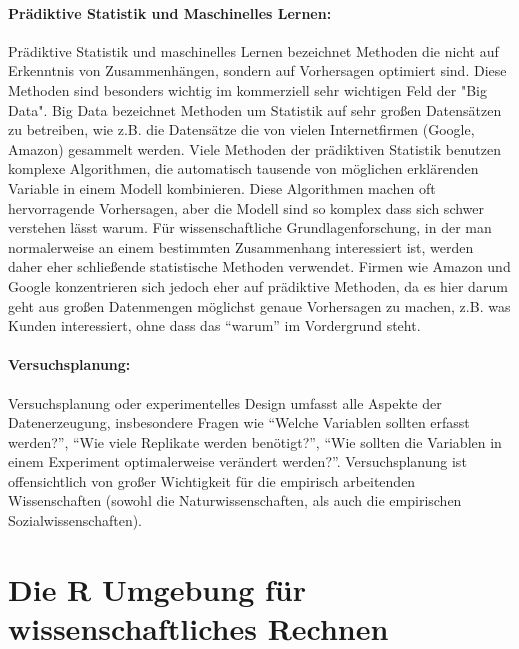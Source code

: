 \documentclass[a4paper,twoside]{tufte-book}\usepackage[]{graphicx}\usepackage[]{color}
\begin{document}
	\paragraph{Prädiktive Statistik und Maschinelles Lernen:} Prädiktive Statistik und maschinelles Lernen bezeichnet Methoden die nicht auf Erkenntnis von Zusammenhängen, sondern auf Vorhersagen optimiert sind. Diese Methoden sind besonders wichtig im kommerziell sehr wichtigen Feld der "Big Data". Big Data bezeichnet Methoden um Statistik auf sehr großen Datensätzen zu betreiben, wie  z.B. die Datensätze die von vielen Internetfirmen (Google, Amazon) gesammelt werden. Viele Methoden der prädiktiven Statistik benutzen komplexe Algorithmen, die automatisch tausende von möglichen erklärenden Variable in einem Modell kombinieren. Diese Algorithmen machen oft hervorragende Vorhersagen, aber die Modell sind so komplex dass sich schwer verstehen lässt warum. Für wissenschaftliche Grundlagenforschung, in der man normalerweise an einem bestimmten Zusammenhang interessiert ist, werden daher eher schließende statistische Methoden verwendet. Firmen wie Amazon und Google konzentrieren sich jedoch eher auf prädiktive Methoden, da es hier darum geht aus großen Datenmengen möglichst genaue Vorhersagen zu machen, z.B. was Kunden interessiert, ohne dass das "`warum"' im Vordergrund steht. 
	
	\paragraph{Versuchsplanung:} Versuchsplanung oder experimentelles Design umfasst alle Aspekte der Datenerzeugung, insbesondere Fragen wie "`Welche Variablen sollten erfasst werden?"', "`Wie viele Replikate werden benötigt?"', "`Wie sollten die Variablen in einem Experiment optimalerweise verändert werden?"'. Versuchsplanung ist offensichtlich von großer Wichtigkeit für die empirisch arbeitenden Wissenschaften (sowohl die Naturwissenschaften, als auch die empirischen Sozialwissenschaften). 
	
	\section{Die R Umgebung für wissenschaftliches Rechnen}
	
\end{document}
